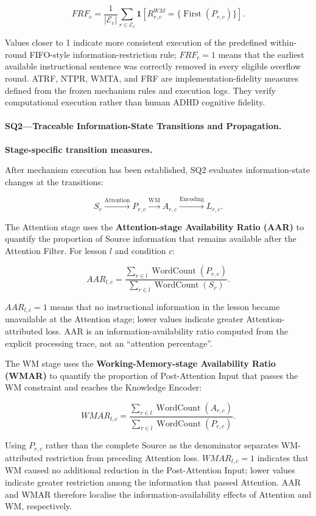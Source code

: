 \[
FRF_c=
\frac{1}{|\mathcal E_c|}
\sum_{r\in\mathcal E_c}
\mathbf{1}
\left[
R^{WM}_{r,c}
=
\{\operatorname{First}(P_{r,c})\}
\right].
\]

Values closer to 1 indicate more consistent execution of the predefined within-round FIFO-style information-restriction rule; $FRF_c=1$ means that the earliest available instructional sentence was correctly removed in every eligible overflow round. ATRF, NTPR, WMTA, and FRF are implementation-fidelity measures defined from the frozen mechanism rules and execution logs. They verify computational execution rather than human ADHD cognitive fidelity.
\paragraph{SQ2---Traceable Information-State Transitions and Propagation.}

\textbf{Stage-specific transition measures.}

After mechanism execution has been established, SQ2 evaluates information-state changes at the transitions:

\[
S_r
\xrightarrow{\text{Attention}}
P_{r,c}
\xrightarrow{\text{WM}}
A_{r,c}
\xrightarrow{\text{Encoding}}
L_{r,c}.
\]

The Attention stage uses the \textbf{Attention-stage Availability Ratio (AAR)} to quantify the proportion of Source information that remains available after the Attention Filter. For lesson $l$ and condition $c$:

\[
AAR_{l,c}
=
\frac{
\sum_{r\in l}\operatorname{WordCount}(P_{r,c})
}{
\sum_{r\in l}\operatorname{WordCount}(S_r)
}.
\]

$AAR_{l,c}=1$ means that no instructional information in the lesson became unavailable at the Attention stage; lower values indicate greater Attention-attributed loss. AAR is an information-availability ratio computed from the explicit processing trace, not an ``attention percentage''.

The WM stage uses the \textbf{Working-Memory-stage Availability Ratio (WMAR)} to quantify the proportion of Post-Attention Input that passes the WM constraint and reaches the Knowledge Encoder:

\[
WMAR_{l,c}
=
\frac{
\sum_{r\in l}\operatorname{WordCount}(A_{r,c})
}{
\sum_{r\in l}\operatorname{WordCount}(P_{r,c})
}.
\]

Using $P_{r,c}$ rather than the complete Source as the denominator separates WM-attributed restriction from preceding Attention loss. $WMAR_{l,c}=1$ indicates that WM caused no additional reduction in the Post-Attention Input; lower values indicate greater restriction among the information that passed Attention. AAR and WMAR therefore localise the information-availability effects of Attention and WM, respectively.

